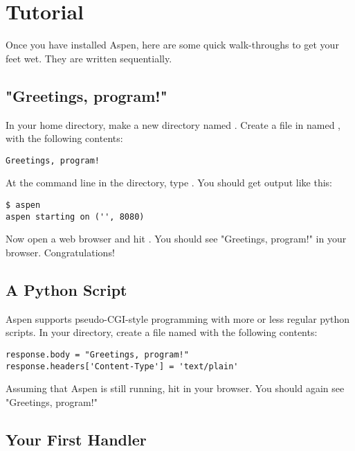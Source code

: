 \chapter{Tutorial \label{tutorial}}

Once you have installed Aspen, here are some quick walk-throughs to get your
feet wet. They are written sequentially.


\section{"Greetings, program!" \label{tutorial-greetings-program}}

In your home directory, make a new directory named . Create a
file in  named , with the following contents:

\begin{verbatim}
Greetings, program!
\end{verbatim}

At the command line in the  directory, type . You
should get output like this:

\begin{verbatim}
$ aspen
aspen starting on ('', 8080)
\end{verbatim}

Now open a web browser and hit . You should see
"Greetings, program!" in your browser. Congratulations!


\section{A Python Script \label{tutorial-pyscript}}

Aspen supports pseudo-CGI-style programming with more or less regular python
scripts. In your  directory, create a file named 
with the following contents:

\begin{verbatim}
response.body = "Greetings, program!"
response.headers['Content-Type'] = 'text/plain'
\end{verbatim}

Assuming that Aspen is still running, hit  in
your browser. You should again see "Greetings, program!"


\section{Your First Handler \label{tutorial-handler}}

